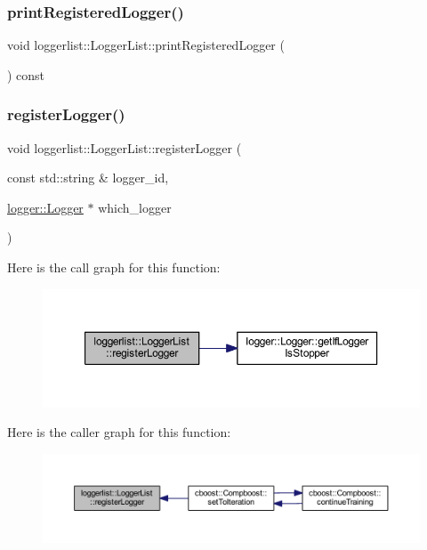 \subsubsection{\texorpdfstring{print\+Registered\+Logger()}{printRegisteredLogger()}}
{\footnotesize\ttfamily void loggerlist\+::\+Logger\+List\+::print\+Registered\+Logger (\begin{DoxyParamCaption}{ }\end{DoxyParamCaption}) const}

\mbox{\label{classloggerlist_1_1_logger_list_a883c2526c3e56e572df670f64b966d41}} 
\subsubsection{\texorpdfstring{register\+Logger()}{registerLogger()}}
{\footnotesize\ttfamily void loggerlist\+::\+Logger\+List\+::register\+Logger (\begin{DoxyParamCaption}\item[{const std\+::string \&}]{logger\+\_\+id,  }\item[{\mbox{\hyperlink{classlogger_1_1_logger}{logger\+::\+Logger}} $\ast$}]{which\+\_\+logger }\end{DoxyParamCaption})}

Here is the call graph for this function\+:\nopagebreak
\begin{figure}[H]
\begin{center}
\leavevmode
\includegraphics[width=350pt]{classloggerlist_1_1_logger_list_a883c2526c3e56e572df670f64b966d41_cgraph}
\end{center}
\end{figure}
Here is the caller graph for this function\+:\nopagebreak
\begin{figure}[H]
\begin{center}
\leavevmode
\includegraphics[width=350pt]{classloggerlist_1_1_logger_list_a883c2526c3e56e572df670f64b966d41_icgraph}
\end{center}
\end{figure}


